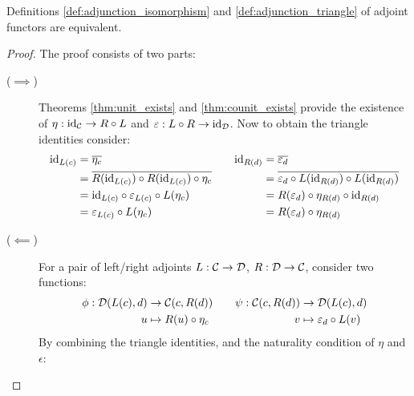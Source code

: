 \begin{theorem}
  Definitions \ref{def:adjunction_isomorphism} and \ref{def:adjunction_triangle}
  of adjoint functors are equivalent.

  \begin{proof}
    The proof consists of two parts:
    \begin{description}
      \item[($\implies$)] Theorems \ref{thm:unit_exists} and
        \ref{thm:counit_exists} provide the existence of $\eta: \mathrm{id}_{\mathcal{C}} \to
        R\circ L$ and $\varepsilon: L\circ R \to \mathrm{id}_{\mathcal{D}}$. Now to obtain the
        triangle identities consider:
        \[
          \begin{aligned}
            \mathrm{id}_{L(c)} &= \overline{\eta_c}\\
              &= \overline{R(\mathrm{id}_{L(c)})\circ R(\mathrm{id}_{L(c)})\circ \eta_c}\\
              &= \mathrm{id}_{L(c)} \circ \varepsilon_{L(c)}\circ L(\eta_c)\\
              &= \varepsilon_{L(c)}\circ L(\eta_c)
          \end{aligned}
          \qquad
          \begin{aligned}
            \mathrm{id}_{R(d)} &= \overline{\varepsilon_d}\\
              &= \overline{\varepsilon_d
                \circ L(\mathrm{id}_{R(d)})\circ L(\mathrm{id}_{R(d)})}\\
              &= R(\varepsilon_d) \circ \eta_{R(d)} \circ \mathrm{id}_{R(d)}\\
              &= R(\varepsilon_d) \circ \eta_{R(d)}
          \end{aligned}
        \]
      \item[($\impliedby$)] For a pair of left/right adjoints $L:\mathcal{C}\to \mathcal{D}$,
        $R:\mathcal{D}\to \mathcal{C}$, consider two functions:
        \[
          \begin{aligned}
            \phi: \mathcal{D}(L(c), d) &\to \mathcal{C}(c, R(d))\\
            u &\mapsto R(u)\circ \eta_c
          \end{aligned}
          \qquad
          \begin{aligned}
            \psi: \mathcal{C}(c, R(d)) &\to \mathcal{D}(L(c), d)\\
            v &\mapsto \varepsilon_d \circ L(v)
          \end{aligned}
        \]
        By combining the triangle identities, and the naturality condition of $\eta$ and $\epsilon$:


\end{description}
\end{proof}
\end{theorem}
